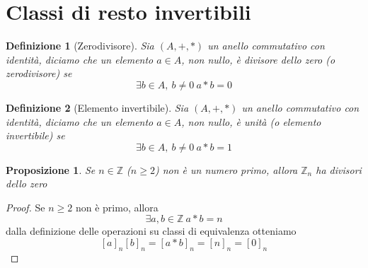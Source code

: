 \documentclass[a4paper]{report}
\newtheorem{proposition}{Proposizione}
\newtheorem{definition}{Definizione}
\newcommand{\Z}{\ensuremath{\mathbb{Z}}}
\begin{document}
\section{Classi di resto invertibili}
\begin{definition}[Zerodivisore]
    Sia $(A,+,*)$ un anello commutativo con identità, diciamo che un elemento $a\in A$, non nullo, è divisore dello zero (o zerodivisore) se
    \[
        \exists b\in A,\ b\neq 0\ a*b=0
    \]
\end{definition}
\begin{definition}[Elemento invertibile]
    Sia $(A,+,*)$ un anello commutativo con identità, diciamo che un elemento $a\in A$, non nullo, è unità (o elemento invertibile) se
    \[
        \exists b\in A,\ b\neq 0\ a*b=1
    \]
\end{definition}
\begin{proposition}
    Se $n\in\Z$ ($n\geq2$) non è un numero primo, allora $\Z_n$ ha divisori dello zero
\end{proposition}
\begin{proof}
    Se $n\geq 2$ non è primo, allora
    \[
        \exists a,b\in\Z\ a*b=n
    \]
    dalla definizione delle operazioni su classi di equivalenza otteniamo
    \[
        [a]_n[b]_n=[a*b]_n=[n]_n=[0]_n
    \]
\end{proof}
\end{document}
